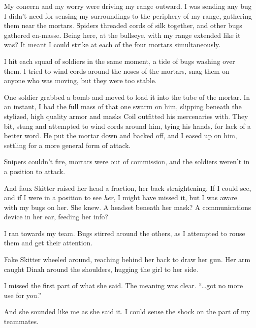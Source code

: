 My concern and my worry were driving my range outward.  I was sending any bug I didn't need for sensing my surroundings to the periphery of my range, gathering them near the mortars.  Spiders threaded cords of silk together, and other bugs gathered en-masse.  Being here, at the bullseye, with my range extended like it was?  It meant I could strike at each of the four mortars simultaneously.



I hit each squad of soldiers in the same moment, a tide of bugs washing over them.  I tried to wind cords around the noses of the mortars, snag them on anyone who was moving, but they were too stable.



One soldier grabbed a bomb and moved to load it into the tube of the mortar.  In an instant, I had the full mass of that one swarm on him, slipping beneath the stylized, high quality armor and masks Coil outfitted his mercenaries with.  They bit, stung and attempted to wind cords around him, tying his hands, for lack of a better word.  He put the mortar down and backed off, and I eased up on him, settling for a more general form of attack.



Snipers couldn't fire, mortars were out of commission, and the soldiers weren't in a position to attack.



And faux Skitter raised her head a fraction, her back straightening.  If I could see, and if I were in a position to see \emph{her}, I might have missed it, but I was aware with my bugs on her. She knew.  A headset beneath her mask?  A communications device in her ear, feeding her info?



I ran towards my team.  Bugs stirred around the others, as I attempted to rouse them and get their attention.



Fake Skitter wheeled around, reaching behind her back to draw her gun.  Her arm caught Dinah around the shoulders, hugging the girl to her side.



I missed the first part of what she said.  The meaning was clear.  ``\ldots{}got no more use for you.''



And she sounded like me as she said it.  I could sense the shock on the part of my teammates.



